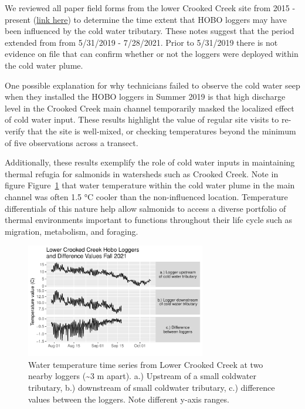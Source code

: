 \documentclass[
  letterpaper,
  DIV=11,
  numbers=noendperiod]{scrreprt}
\begin{document}
We reviewed all paper field forms from the lower Crooked Creek site from
2015 - present
(\href{https://docs.google.com/spreadsheets/d/1jfe6u_xr8-abv8HMxyOm88xEsR4ahYTLGPtztjxSivQ/edit?usp=sharing}{link
here}) to determine the time extent that HOBO loggers may have been
influenced by the cold water tributary. These notes suggest that the
period extended from from 5/31/2019 - 7/28/2021. Prior to 5/31/2019
there is not evidence on file that can confirm whether or not the
loggers were deployed within the cold water plume.

One possible explanation for why technicians failed to observe the cold
water seep when they installed the HOBO loggers in Summer 2019 is that
high discharge level in the Crooked Creek main channel temporarily
masked the localized effect of cold water input. These results highlight
the value of regular site visits to re-verify that the site is
well-mixed, or checking temperatures beyond the minimum of five
observations across a transect.

Additionally, these results exemplify the role of cold water inputs in
maintaining thermal refugia for salmonids in watersheds such as Crooked
Creek. Note in figure Figure~\ref{fig-cc-plots} that water temperature
within the cold water plume in the main channel was often 1.5 °C cooler
than the non-influenced location. Temperature differentials of this
nature help allow salmonids to access a diverse portfolio of thermal
environments important to functions throughout their life cycle such as
migration, metabolism, and foraging.

\begin{figure}

{\centering \includegraphics[width=0.7\textwidth,height=0.7\textheight]{./temp_logger_data_prep_files/figure-pdf/fig-cc-plots-1.pdf}

}

\caption{\label{fig-cc-plots}Water temperature time series from Lower
Crooked Creek at two nearby loggers (\textasciitilde3 m apart). a.)
Upstream of a small coldwater tributary, b.) downstream of small
coldwater tributary, c.) difference values between the loggers. Note
different y-axis ranges.}

\end{figure}
\end{document}
